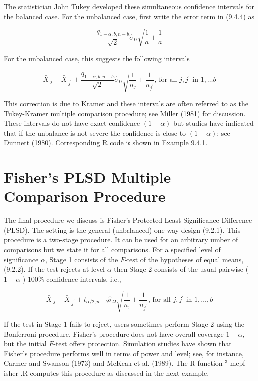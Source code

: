 The statistician John Tukey developed these simultaneous confidence intervals for the balanced case. For the unbalanced case, first write the error term in (9.4.4) as

$$
\frac{q_{1-\alpha, b, n-b}}{\sqrt{2}} \hat{\sigma}_{\Omega} \sqrt{\frac{1}{a}+\frac{1}{a}}
$$

For the unbalanced case, this suggests the following intervals


\begin{equation*}
\bar{X}_{\cdot j}-\bar{X}_{\cdot j^{\prime}} \pm \frac{q_{1-\alpha, b, n-b}}{\sqrt{2}} \hat{\sigma}_{\Omega} \sqrt{\frac{1}{n_{j}}+\frac{1}{n_{j^{\prime}}}} \text {, for all } j, j^{\prime} \text { in } 1, \ldots b \tag{9.4.5}
\end{equation*}


This correction is due to Kramer and these intervals are often referred to as the Tukey-Kramer multiple comparison procedure; see Miller (1981) for discussion. These intervals do not have exact confidence $(1-\alpha)$ but studies have indicated that if the unbalance is not severe the confidence is close to $(1-\alpha)$; see Dunnett (1980). Corresponding R code is shown in Example 9.4.1.

\section*{Fisher's PLSD Multiple Comparison Procedure}
The final procedure we discuss is Fisher's Protected Least Significance Difference (PLSD). The setting is the general (unbalanced) one-way design (9.2.1). This procedure is a two-stage procedure. It can be used for an arbitrary umber of comparisons but we state it for all comparisons. For a specified level of significance $\alpha$, Stage 1 consists of the $F$-test of the hypotheses of equal means, (9.2.2). If the test rejects at level $\alpha$ then Stage 2 consists of the usual pairwise ( $1-\alpha$ ) $100 \%$ confidence intervals, i.e.,


\begin{equation*}
\bar{X}_{\cdot j}-\bar{X}_{\cdot j^{\prime}} \pm t_{\alpha / 2, n-b} \hat{\sigma}_{\Omega} \sqrt{\frac{1}{n_{j}}+\frac{1}{n_{j^{\prime}}}} \text {, for all } j, j^{\prime} \text { in } 1, \ldots, b \tag{9.4.6}
\end{equation*}


If the test in Stage 1 fails to reject, users sometimes perform Stage 2 using the Bonferroni procedure. Fisher's procedure does not have overall coverage $1-\alpha$, but the initial $F$-test offers protection. Simulation studies have shown that Fisher's procedure performs well in terms of power and level; see, for instance, Carmer and Swanson (1973) and McKean et al. (1989). The R function ${ }^{3}$ mcpf isher .R computes this procedure as discussed in the next example.

